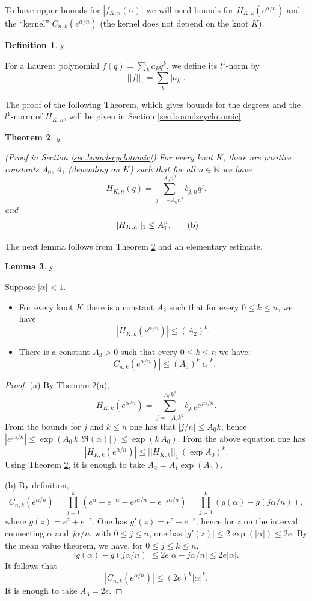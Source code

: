 \documentclass{amsart}
\newtheorem{theorem}{Theorem}[section]
\theoremstyle{definition}
\newtheorem{lemma}[theorem]{Lemma}
\newtheorem{definition}[theorem]{Definition}
\def\printname#1{
    \if\draft y
        \smash{\makebox[0pt]{\hspace{-0.5in}
            \raisebox{8pt}{\tt\tiny #1}}}
    \fi
}
\def\lbl#1{\label{#1}\printname{#1}}
\def\BN{\mathbb N}
\def\a{\alpha}
\begin{document}
To have upper bounds for $|f_{K,n}(\a)|$ we will need bounds for
$H_{K,k}(e^{\a/n})$ and the ``kernel'' $C_{n,k}(e^{\a/n})$ (the
kernel does not depend on the knot $K$).


\begin{definition}
\lbl{def.l1norm}
For a Laurent polynomial $f(q)=\sum_k a_k q^k$, we define its
$l^1$-norm by
$$
||f||_1=\sum_k |a_k|.
$$
\end{definition}
The proof of the following Theorem, which gives bounds for the
degrees and the $l^1$-norm of $H_{K,n}$, will be given in Section
\ref{sec.boundscyclotomic}.

\begin{theorem}
\lbl{thm.boundC}
{\rm (Proof in Section \ref{sec.boundscyclotomic})}
For every knot $K$, there are positive constants
$A_0, A_1$ (depending on $K$) such that for all $n \in \BN$ we have
\begin{equation}
H_{K,n}(q) = \sum_{j=-A_0n^2}^{A_0n^2} b_{j,n} q^j.
\tag{a}\label{eq1}
\end{equation}
and
\begin{equation}
\lbl{eq.LC} ||H_{K,n}||_1 \leq A_1^n . \tag{b}
\end{equation}
\end{theorem}


The next lemma follows from Theorem \ref{thm.boundC} and an elementary estimate.

\begin{lemma}
\lbl{lem.estimate}
Suppose $|\a| < 1$.
\begin{itemize}
\item[(a)]   For every knot $K$ there is a constant
$A_2$ such that for every $ 0\le k\le n$, we have
$$
|H_{K,k}(e^{\a/n}) | \le (A_2)^k.
$$
\item[(b)]
There is a constant $A_3 >0$ such that every $ 0\le k \leq n$ we
have:
$$
|C_{n,k}(e^{\a/n})| \leq (A_3)^k |\a|^k.
$$
\end{itemize}
\end{lemma}

\begin{proof}
(a) By Theorem \ref{thm.boundC}(a),
$$
H_{K,k}(e^{\a/n}) = \sum_{j=-A_0k^2}^{A_0k^2} b_{j,k} e^{j\a/n}.
$$
From the bounds for $j$ and $k\le n$  one has that $|j/n| \le A_0 k$,
hence $ |e^{j\a/n}| \le \exp (A_0\,  k\, |\Re(\a)|) \le \exp(k \, A_0) $. From
the above equation one has
$$
\left | H_{K,k}(e^{\a/n})\right | \le ||H_{K,k}||_1 \, (\exp A_0)^k.
$$
Using Theorem \ref{thm.boundC}, it is enough to take $A_2 = A_1
\exp(A_0)$.

(b) By definition,
$$
C_{n,k}(e^{\a/n})=\prod_{j=1}^{k} (e^{\a}+e^{-\a}-e^{j\a/n}
-e^{-j\a/n}) = \prod_{j=1}^{k} \left(g(\a) -g(j\a/n)\right),
$$
where $g(z)= e^z + e^{-z}$. One has $g'(z) = e^z -e^{-z}$, hence for
$z$ on the interval connecting $\a$ and $j\a/n$, with $0\le j\le n$,
one has $|g'(z)| \le 2 \exp(|\a|) \le  2e$. By the mean value theorem,
we have, for $0 \le j \le k \le n$,
$$
|g(\a) -g(j\a/n)| \le 2 e |\a -j\a/n| \le  2 e |\a|.
$$
It follows that
$$
|C_{n,k}(e^{\a/n})| \le (2 e)^k |\a|^k.$$ It is enough to take
$A_3=2e$.
\end{proof}
\end{document}

